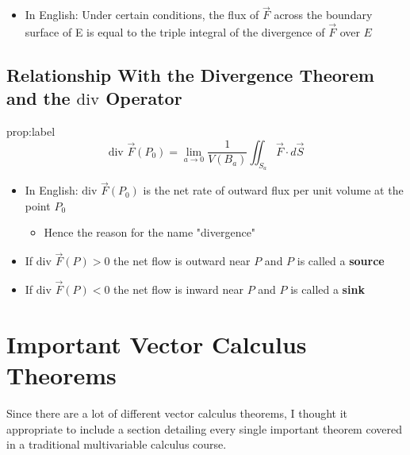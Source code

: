 \documentclass{package/notes}
\begin{document}
\begin{itemize}
	\item In English: Under certain conditions, the flux of $\vec{F}$ across the boundary surface of E is equal to the triple integral of the divergence of $\vec{F}$ over $E$ 
\end{itemize}


\subsection{Relationship With the Divergence Theorem and the $\text{div}$ Operator}

\begin{proposition}{prop:label}
	$$\text{div } \vec{F}(P_0) = \lim_{a\to 0} \frac{1}{V(B_a)}\iint_{S_a} \vec{F} \cdot d\vec{S}$$
\end{proposition}

\begin{itemize}
	\item In English: $\text{div } \vec{F}(P_0)$ is the net rate of outward flux per unit volume at the point $P_0$
	\begin{itemize}
		\item Hence the reason for the name "divergence"
	\end{itemize}
	\item If $\text{div } \vec{F}(P) > 0$ the net flow is outward near $P$ and $P$ is called a \textbf{source}
	\item If $\text{div } \vec{F}(P) < 0$ the net flow is inward near $P$ and $P$ is called a \textbf{sink}
\end{itemize}


\newpage

\section{Important Vector Calculus Theorems}

Since there are a lot of different vector calculus theorems, I thought it appropriate to include a section detailing every single important theorem covered in a traditional multivariable calculus course. 
\end{document}
